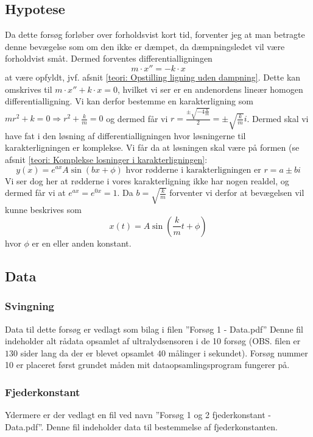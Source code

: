 \subsection{Hypotese}
Da dette forsøg forløber over forholdsvist kort tid, forventer jeg at man betragte denne bevægelse som om den ikke er dæmpet, da dæmpningsledet vil være forholdvist småt. 
Dermed forventes differentialligningen 
$$m\cdot x'' = -k \cdot x$$
at være opfyldt, jvf. afsnit \ref{teori: Opstilling ligning uden dampning}.
Dette kan omskrives til $m\cdot x'' + k\cdot x=0$, hvilket vi ser er en andenordens lineær homogen differentialligning. 
Vi kan derfor bestemme en karakterligning som $mr^2 + k = 0 \Rightarrow r^2 + \frac{k}{m} = 0$ og dermed får vi $r = \frac{\pm \sqrt{-4\frac{k}{m}}}{2}=\pm\sqrt{\frac{k}{m}}i$.
Dermed skal vi have fat i den løsning af differentialligningen hvor løsningerne til karakterligningen er komplekse. 
Vi får da at løsningen skal være på formen (se afsnit \ref{teori: Komplekse losninger i karakterligningen}:
$$y(x) = e^{ax}A\sin(bx+\phi) \text{ hvor rødderne i karakterligningen er } r = a \pm bi$$
Vi ser dog her at rødderne i vores karakterligning ikke har nogen realdel, og dermed får vi at $e^{ax}=e^{0x}=1$.
Da $b=\sqrt{\frac{k}{m}}$ forventer vi derfor at bevægelsen vil kunne beskrives som 
$$x(t)=A\sin (\frac{k}{m}t+\phi)$$
hvor $\phi$ er en eller anden konstant. 


\subsection{Data}
\subsubsection{Svingning}
Data til dette forsøg er vedlagt som bilag i filen ''Forsøg 1 - Data.pdf''
Denne fil indeholder alt rådata opsamlet af ultralydsensoren i de 10 forsøg (OBS. filen er $130$ sider lang da der er blevet opsamlet $40$ målinger i sekundet). 
Forsøg nummer 10 er placeret først grundet måden mit dataopsamlingsprogram fungerer på.

\subsubsection{Fjederkonstant}
Ydermere er der vedlagt en fil ved navn ''Forsøg 1 og 2 fjederkonstant - Data.pdf''.
Denne fil indeholder data til bestemmelse af fjederkonstanten. 

